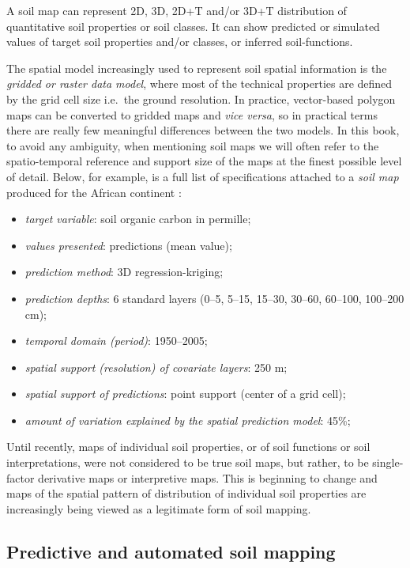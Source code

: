 \documentclass[graybox,natbib,nospthms,UStrade]{svmono}
\let\BeginKnitrBlock\begin \let\EndKnitrBlock\end
\let\BeginKnitrBlock\begin \let\EndKnitrBlock\end
\begin{document}
\BeginKnitrBlock{rmdnote}
A soil map can represent 2D, 3D, 2D+T
and/or 3D+T distribution of quantitative soil properties or soil
classes. It can show predicted or simulated values of target soil
properties and/or classes, or inferred soil-functions.
\EndKnitrBlock{rmdnote}

The spatial model increasingly used to represent soil spatial
information is the \emph{gridded or raster data model}, where most of the
technical properties are defined by the grid cell size i.e.~the ground
resolution. In practice,
vector-based polygon maps can be converted to gridded maps and \emph{vice
versa}, so in practical terms there are really few meaningful differences
between the two models. In this book, to avoid any ambiguity, when
mentioning soil maps we will often refer to the spatio-temporal
reference and support size of the maps at the finest possible level of
detail. Below, for example, is a full list of specifications attached to
a \emph{soil map} produced for the African continent \citep{Hengl2015AfSoilGrids250m}:

\begin{itemize}
\item
  \emph{target variable}: soil organic carbon in permille;
\item
  \emph{values presented}: predictions (mean value);
\item
  \emph{prediction method}: 3D regression-kriging;
\item
  \emph{prediction depths}: 6 standard layers (0--5, 5--15, 15--30, 30--60,
  60--100, 100--200 cm);
\item
  \emph{temporal domain (period)}: 1950--2005;
\item
  \emph{spatial support (resolution) of covariate layers}: 250 m;
\item
  \emph{spatial support of predictions}: point support (center of a grid
  cell);
\item
  \emph{amount of variation explained by the spatial prediction model}: 45\%;
\end{itemize}

Until recently, maps of individual soil properties, or of soil functions
or soil interpretations, were not considered to be true soil maps, but
rather, to be single-factor derivative maps or interpretive maps. This
is beginning to change and maps of the spatial pattern of distribution
of individual soil properties are increasingly being viewed as a
legitimate form of soil mapping.

\hypertarget{pedometric-mapping}{%
\subsection{Predictive and automated soil mapping}\label{pedometric-mapping}}
\end{document}
